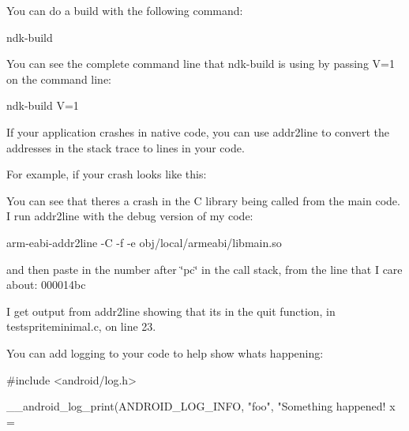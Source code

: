 You can do a build with the following command\+: \begin{DoxyVerb}ndk-build
\end{DoxyVerb}


You can see the complete command line that ndk-\/build is using by passing V=1 on the command line\+: \begin{DoxyVerb}ndk-build V=1
\end{DoxyVerb}


If your application crashes in native code, you can use addr2line to convert the addresses in the stack trace to lines in your code.

For example, if your crash looks like this\+: 


You can see that there\textquotesingle{}s a crash in the C library being called from the main code. I run addr2line with the debug version of my code\+: \begin{DoxyVerb}arm-eabi-addr2line -C -f -e obj/local/armeabi/libmain.so
\end{DoxyVerb}


and then paste in the number after \char`\"{}pc\char`\"{} in the call stack, from the line that I care about\+: 000014bc

I get output from addr2line showing that it\textquotesingle{}s in the quit function, in testspriteminimal.\+c, on line 23.

You can add logging to your code to help show what\textquotesingle{}s happening\+: \begin{DoxyVerb}#include <android/log.h>

__android_log_print(ANDROID_LOG_INFO, "foo", "Something happened! x = %
\end{DoxyVerb}


